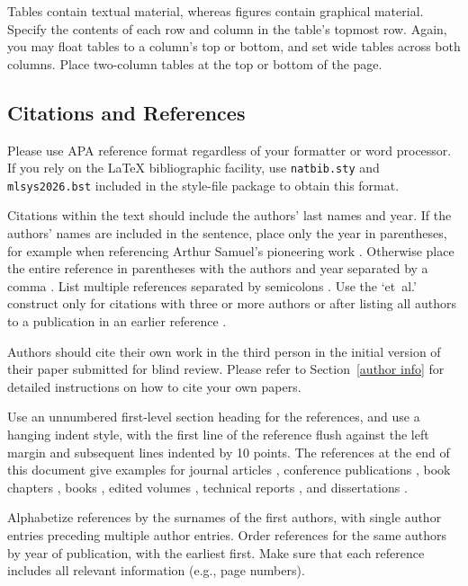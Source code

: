 \documentclass{article}
\begin{document}
Tables contain textual material, whereas figures contain graphical material.
Specify the contents of each row and column in the table's topmost
row. Again, you may float tables to a column's top or bottom, and set
wide tables across both columns. Place two-column tables at the
top or bottom of the page.

\subsection{Citations and References}

Please use APA reference format regardless of your formatter
or word processor. If you rely on the \LaTeX\/ bibliographic
facility, use \texttt{natbib.sty} and \texttt{mlsys2026.bst}
included in the style-file package to obtain this format.

Citations within the text should include the authors' last names and
year. If the authors' names are included in the sentence, place only
the year in parentheses, for example when referencing Arthur Samuel's
pioneering work . Otherwise place the entire
reference in parentheses with the authors and year separated by a
comma \cite{Samuel59}. List multiple references separated by
semicolons \cite{kearns89,Samuel59,mitchell80}. Use the `et~al.'
construct only for citations with three or more authors or after
listing all authors to a publication in an earlier reference \cite{MachineLearningI}.

Authors should cite their own work in the third person
in the initial version of their paper submitted for blind review.
Please refer to Section~\ref{author info} for detailed instructions on how to
cite your own papers.

Use an unnumbered first-level section heading for the references, and use a
hanging indent style, with the first line of the reference flush against the
left margin and subsequent lines indented by 10 points. The references at the
end of this document give examples for journal articles \cite{Samuel59},
conference publications \cite{langley00}, book chapters \cite{Newell81}, books
\cite{DudaHart2nd}, edited volumes \cite{MachineLearningI}, technical reports
\cite{mitchell80}, and dissertations \cite{kearns89}.

Alphabetize references by the surnames of the first authors, with
single author entries preceding multiple author entries. Order
references for the same authors by year of publication, with the
earliest first. Make sure that each reference includes all relevant
information (e.g., page numbers).
\end{document}

